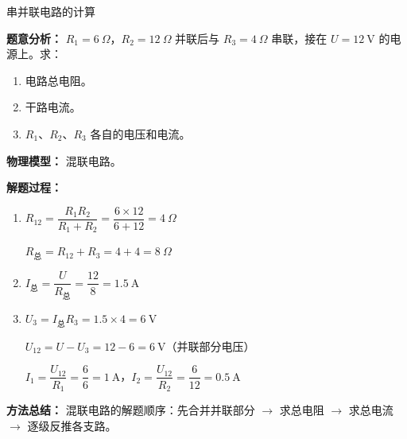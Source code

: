 \begin{examplebox}{串并联电路的计算}

\textbf{题意分析：} $R_1 = 6\ \Omega$，$R_2 = 12\ \Omega$ 并联后与 $R_3 = 4\ \Omega$ 串联，接在 $U = 12\ \mathrm{V}$ 的电源上。求：
\begin{enumerate}
  \item 电路总电阻。
  \item 干路电流。
  \item $R_1$、$R_2$、$R_3$ 各自的电压和电流。
\end{enumerate}

\textbf{物理模型：} 混联电路。

\begin{center}


\label{fig:mixed-circuit-example}
\end{center}

\textbf{解题过程：}

\begin{enumerate}
  \item $R_{12} = \dfrac{R_1 R_2}{R_1 + R_2} = \dfrac{6 \times 12}{6 + 12} = 4\ \Omega$

  $R_{\text{总}} = R_{12} + R_3 = 4 + 4 = 8\ \Omega$

  \item $I_{\text{总}} = \dfrac{U}{R_{\text{总}}} = \dfrac{12}{8} = 1.5\ \mathrm{A}$

  \item $U_3 = I_{\text{总}} R_3 = 1.5 \times 4 = 6\ \mathrm{V}$

  $U_{12} = U - U_3 = 12 - 6 = 6\ \mathrm{V}$（并联部分电压）

  $I_1 = \dfrac{U_{12}}{R_1} = \dfrac{6}{6} = 1\ \mathrm{A}$，$I_2 = \dfrac{U_{12}}{R_2} = \dfrac{6}{12} = 0.5\ \mathrm{A}$
\end{enumerate}

\textbf{方法总结：} 混联电路的解题顺序：先合并并联部分 $\to$ 求总电阻 $\to$ 求总电流 $\to$ 逐级反推各支路。

\end{examplebox}

